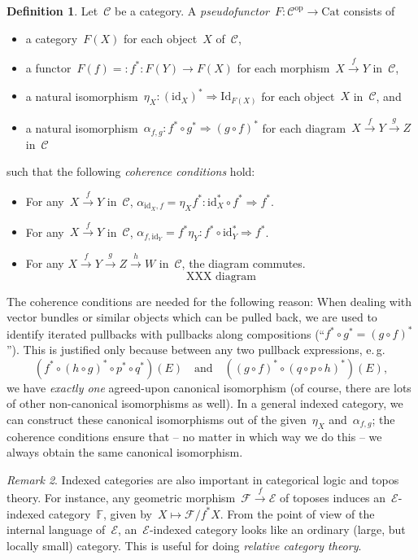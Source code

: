 \documentclass[a4paper,english,12pt]{scrartcl}
\theoremstyle{definition}
\newtheorem{defn}{Definition}[section]
\theoremstyle{plain}
\theoremstyle{remark}
\newtheorem{rem}[defn]{Remark}
\newcommand{\FF}{\mathbb{F}}
\newcommand{\C}{\mathcal{C}}
\newcommand{\E}{\mathcal{E}}
\newcommand{\F}{\mathcal{F}}
\newcommand{\id}{\mathrm{id}}
\newcommand{\op}{\mathrm{op}}
\newcommand{\xra}[1]{\xrightarrow{#1}}
\newcommand{\Cat}{\mathrm{Cat}}
\newcommand{\Id}{\mathrm{Id}}
\begin{document}
\begin{defn}Let~$\C$ be a category. A \emph{pseudofunctor}~$F : \C^\op \to
\Cat$ consists of
\begin{itemize}
\item a category~$F(X)$ for each object~$X$ of~$\C$,
\item a functor~$F(f) =: f^* : F(Y) \to F(X)$ for each morphism~$X \xra{f} Y$ in~$\C$,
\item a natural isomorphism~$\eta_X : (\id_X)^* \Rightarrow \Id_{F(X)}$ for each
object~$X$ in~$\C$, and
\item a natural isomorphism~$\alpha_{f,g} : f^* \circ g^* \Rightarrow (g \circ
f)^*$ for each diagram~$X \xra{f} Y \xra{g} Z$ in~$\C$
\end{itemize}
such that the following \emph{coherence conditions} hold:
\begin{itemize}
\item For any~$X \xra{f} Y$ in~$\C$, $\alpha_{\id_X,f} = \eta_X f^* : \id_X^* \circ f^*
\Rightarrow f^*$.
\item For any~$X \xra{f} Y$ in~$\C$, $\alpha_{f,\id_Y} = f^* \eta_Y : f^* \circ
\id_Y^* \Rightarrow f^*$.
\item For any $X \xra{f} Y \xra{g} Z \xra{h} W$ in~$\C$, the diagram commutes.
\[ \text{XXX diagram} \]
\end{itemize}
\end{defn}

The coherence conditions are needed for the following reason:
When dealing with vector bundles or similar objects which can be pulled back,
we are used to identify iterated pullbacks with pullbacks along compositions
(``$f^* \circ g^* = (g \circ f)^*$'').
This is justified only because between any
two pullback expressions, e.\,g.\@
\[ (f^* \circ (h \circ g)^* \circ p^* \circ q^*)(E) \quad\text{and}\quad
  ((g \circ f)^* \circ (q \circ p \circ h)^*)(E), \]
we have \emph{exactly one} agreed-upon canonical isomorphism (of course, there
are lots of other non-canonical isomorphisms as well). In a general indexed
category, we can construct these canonical isomorphisms out of the
given~$\eta_X$ and~$\alpha_{f,g}$; the coherence conditions ensure that -- no
matter in which way we do this -- we always obtain the same canonical
isomorphism.

\begin{rem}Indexed categories are also important in categorical logic and topos
theory. For instance, any geometric morphism~$\F \xra{f} \E$ of toposes induces
an~$\E$-indexed category~$\FF$, given by~$X \mapsto \F/f^*X$. From the point of
view of the internal language of~$\E$, an~$\E$-indexed category looks like an
ordinary (large, but locally small) category. This is useful for doing \emph{relative category theory}.
\end{rem}
\end{document}
